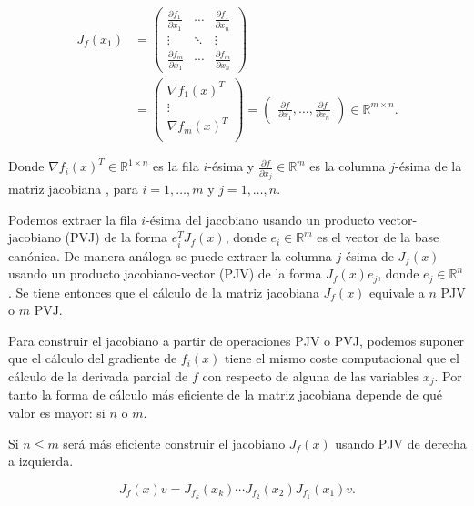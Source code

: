 \begin{align*}
	J_f(x_1)&=
	\begin{pmatrix}
	\frac{\partial f_1}{\partial x_1} & \cdots & \frac{\partial f_1}{\partial x_n} \\	
	\vdots & \ddots & \vdots \\
	\frac{\partial f_m}{\partial x_1} & \cdots & \frac{\partial f_m}{\partial x_n} 
	\end{pmatrix} \\
	&= 
	\begin{pmatrix}
	 \nabla f_1(x)^T\\
	 \vdots \\
	 \nabla f_m(x)^T \\
	\end{pmatrix}=
	\begin{pmatrix}
	     \frac{\partial f}{\partial x_1}, \ldots, \frac{\partial f}{\partial x_n}
	\end{pmatrix} \in \mathbb{R}^{m \times n}.
\end{align*}





Donde $\nabla f_i(x) ^T \in \mathbb{R}^{1 \times n} $ es la fila $i$-ésima y $\frac{\partial f}{\partial x_j} \in \mathbb{R}^m$ es la columna $j$-ésima de la matriz jacobiana , para $i=1,\ldots,m$ y $j=1,\ldots,n$.

Podemos extraer la fila $i$-ésima del jacobiano usando un producto vector-jacobiano (PVJ) de la forma $e_i^T J_f(x)$, donde $e_i \in \mathbb{R}^m$ es el vector de la base canónica. De manera análoga se puede extraer la columna $j$-ésima de $J_f(x)$ usando un producto jacobiano-vector (PJV) de la forma $J_f(x)e_j$, donde $e_j \in \mathbb{R}^n$. Se tiene entonces que el cálculo de la matriz jacobiana $J_f(x)$ equivale a $n$ PJV o $m$ PVJ. 


Para construir el jacobiano a partir de operaciones PJV o PVJ, podemos suponer que el cálculo del gradiente de $f_i(x)$ tiene el mismo coste computacional que el cálculo de la derivada parcial de $f$ con respecto de alguna de las variables $x_j$. Por tanto la forma de cálculo más eficiente de la matriz jacobiana depende de qué valor es mayor: si $n$ o $m$.



Si $n\leq m$ será más eficiente construir el jacobiano $J_f(x)$ usando PJV de derecha a izquierda.

$$J_f(x)v=J_{f_k}(x_k) \cdots J_{f_2}(x_2) J_{f_1}(x_1) v.$$

